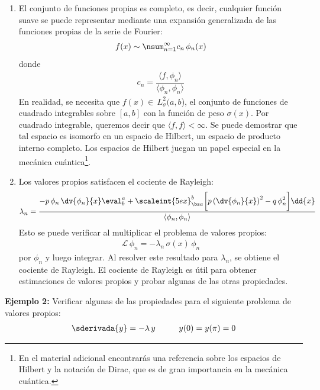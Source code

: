 \begin{enumerate}
\item El conjunto de funciones propias es completo, es decir, cualquier función suave se puede representar mediante una expansión generalizada de las funciones propias de la serie de Fourier:
\begin{align*}
f(x) \sim \nsum_{n=1}^{\infty} c_{n} \, \phi_{n} (x)
\end{align*}
donde
\begin{align*}
c_{n} = \dfrac{\langle f, \phi_{n} \rangle}{\langle \phi_{n}, \phi_{n} \rangle}
\end{align*}
En realidad, se necesita que $f (x) \in \, L_{\sigma}^{2} (a, b$), el conjunto de funciones de cuadrado integrables sobre $[a, b]$ con la función de peso $\sigma (x)$. Por cuadrado integrable, queremos decir que $\langle f,  f \rangle < \infty$. Se puede demostrar que tal espacio es isomorfo en un espacio de Hilbert, un espacio de producto interno completo. Los espacios de Hilbert juegan un papel especial en la mecánica cuántica\footnote{En el material adicional encontrarás una referencia sobre los espacios de Hilbert y la notación de Dirac, que es de gran importancia en la mecánica cuántica.}.
\item Los valores propios satisfacen el cociente de Rayleigh:
\begin{align*}
\lambda_{n} = \dfrac{- p \, \phi_{n} \, \displaystyle \dv{\phi_{n}}{x} \eval_{b}^{a} + \scaleint{5ex}_{\bs a}^{b} \bigg[ p \left( \dv{\phi_{n}}{x} \right)^{2} - q \, \phi_{n}^{2} \bigg] \dd{x}}{\langle  \phi_{n}, \phi_{n} \rangle} 
\end{align*}
Esto se puede verificar al multiplicar el problema de valores propios:
\begin{align*}
\mathcal{L} \, \phi_{n} = - \lambda_{n} \, \sigma(x) \, \phi_{n}
\end{align*}
por $\phi_{n}$ y luego integrar. Al resolver este resultado para $\lambda_{n}$, se obtiene el cociente de Rayleigh. El cociente de Rayleigh es útil para obtener estimaciones de valores propios y probar algunas de las otras propiedades.
\end{enumerate}

\textbf{Ejemplo 2: } Verificar algunas de las propiedades para el siguiente problema de valores propios:
\begin{align*}
\sderivada{y} = - \lambda \, y \hspace{1cm} y(0) = y(\pi) = 0
\end{align*}

